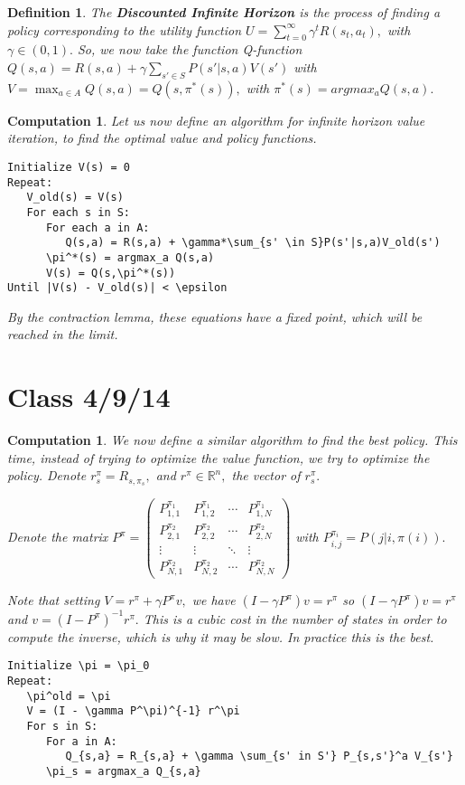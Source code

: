 \documentclass{amsart}
\newtheorem{comp}[subsubsection]{Computation}
\newtheorem{defn}[subsubsection]{Definition}
\begin{document}
\begin{defn}
The {\bf Discounted Infinite Horizon} is the process of finding a policy corresponding to the utility function $U = \sum_{t = 0}^ \infty \gamma^t R(s_t,a_t),$ with $\gamma \in (0,1).$ So, we now take the function Q-function $Q(s,a) = R(s,a)+ \gamma \sum_{s' \in S} P(s'|s,a)V(s')$ with $V = \max_{a \in A} Q(s,a) = Q(s,\pi^*(s)),$ with $\pi^*(s) = argmax_a Q(s,a).$
\end{defn}

\begin{comp}
Let us now define an algorithm for infinite horizon value iteration, to find the optimal value and policy functions.
\begin{verbatim}
Initialize V(s) = 0
Repeat:
   V_old(s) = V(s)
   For each s in S:
      For each a in A:
         Q(s,a) = R(s,a) + \gamma*\sum_{s' \in S}P(s'|s,a)V_old(s')
      \pi^*(s) = argmax_a Q(s,a)
      V(s) = Q(s,\pi^*(s))
Until |V(s) - V_old(s)| < \epsilon
\end{verbatim}

By the contraction lemma, these equations have a fixed point, which will be reached in the limit.

\end{comp}
\section{Class 4/9/14}
\begin{comp}

We now define a similar algorithm to find the best policy. This time, instead of trying to optimize the value function, we try to optimize the policy. Denote $r^\pi_s = R_{s,\pi_s},$ and $r^\pi \in \mathbb R^n,$ the vector of $r^\pi_s.$

Denote the matrix 
$P^\pi = 
\begin{pmatrix}
P_{1,1}^{\pi_1} & P_{1,2}^{\pi_1} & \cdots &P_{1,N}^{\pi_1} \\
P_{2,1}^{\pi_2} & P_{2,2}^{\pi_2} & \cdots & P_{2,N}^{\pi_2} \\
\vdots & \vdots & \ddots & \vdots \\
P_{N,1}^{\pi_2} & P_{N,2}^{\pi_2} & \cdots & P_{N,N}^{\pi_2}
\end{pmatrix}$
with $P_{i,j}^{\pi_i} = P(j|i,\pi(i)).$

Note that setting $ V = r^\pi + \gamma P^\pi v,$ we have $(I - \gamma P^\pi) v = r^\pi$ so $(I- \gamma P^\pi)v = r^\pi$ and $v = (I-P^\pi)^{-1}r^\pi.$
This is a cubic cost in the number of states in order to compute the inverse, which is why it may be slow. In practice this is the best.
\begin{verbatim}
Initialize \pi = \pi_0
Repeat:
   \pi^old = \pi
   V = (I - \gamma P^\pi)^{-1} r^\pi
   For s in S:
      For a in A:
         Q_{s,a} = R_{s,a} + \gamma \sum_{s' in S'} P_{s,s'}^a V_{s'}
      \pi_s = argmax_a Q_{s,a}
\end{verbatim}

\end{comp}
\end{document}
